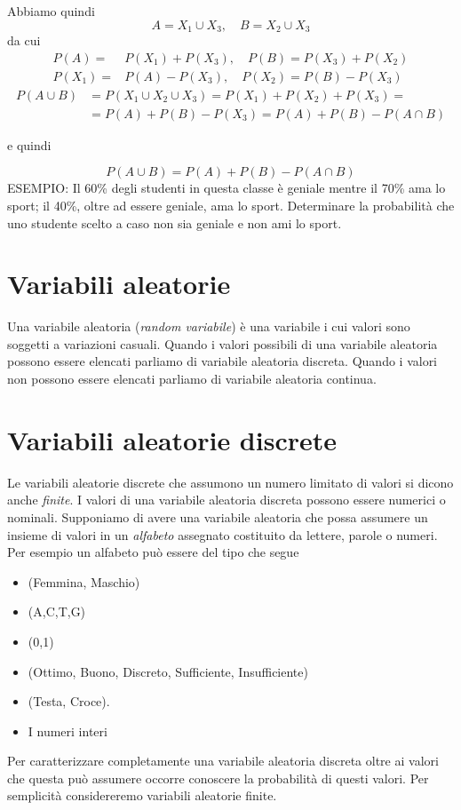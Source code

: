 \documentclass[onecolumn,12pt]{book}\usepackage[]{graphicx}\usepackage[]{color}
\begin{document}
Abbiamo quindi
\[A=X_1\cup X_3, \quad B=X_2\cup X_3\]
da cui
\begin{align*} P(A)=&P(X_1)+P(X_3),\quad P(B)=P(X_3)+P(X_2)\\
 P(X_1)=&P(A)-P(X_3),\quad P(X_2)=P(B)-P(X_3)
 \end{align*}
\begin{align*} P(A\cup B)&=P(X_1\cup X_2\cup X_3)=P(X_1)+P(X_2)+P(X_3)=\\
&=P(A) +P(B)-P(X_3)=P(A) +P(B)-P(A\cap B)\end{align*}

e quindi 

$$P(A\cup B)=P(A) +P(B)-P(A\cap B)$$
ESEMPIO: Il 60\% degli studenti in questa classe è geniale mentre il   70\% ama lo sport; il 40\%, oltre ad essere geniale, ama lo sport. Determinare la probabilità che uno studente scelto a caso non sia geniale e non ami lo sport.


 
 

\section{Variabili aleatorie}
Una variabile aleatoria (\emph{random variabile}) \`e
 una variabile i cui valori sono soggetti a variazioni casuali. Quando i valori possibili di una variabile aleatoria  possono essere elencati parliamo di variabile aleatoria discreta. Quando i valori non possono essere elencati parliamo di variabile aleatoria continua.

\section{Variabili aleatorie discrete}
Le variabili aleatorie  discrete che  assumono un numero limitato di valori si dicono anche \emph{finite}.  I valori di una variabile aleatoria discreta possono essere numerici o nominali.
 Supponiamo di avere una variabile aleatoria che possa assumere un insieme di valori in  un \emph{alfabeto} assegnato costituito da lettere, parole o numeri. Per esempio un alfabeto pu\`o essere del tipo che segue
\begin{itemize}
\item{}(Femmina, Maschio)
\item{}(A,C,T,G)
\item{} (0,1)
\item{}(Ottimo, Buono, Discreto, Sufficiente, Insufficiente)
\item{} (Testa, Croce).
\item{} I numeri interi
\end{itemize}
Per caratterizzare completamente una variabile aleatoria discreta oltre ai valori che questa pu\`o  assumere occorre conoscere la probabilit\`a  di questi valori.
Per semplicit\`a considereremo variabili aleatorie finite.\\
\end{document}
